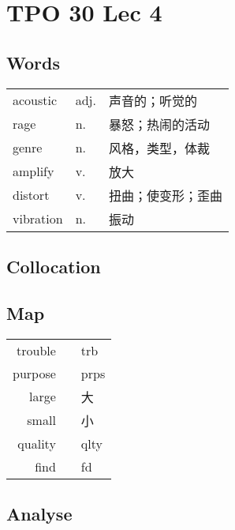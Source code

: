 \section{TPO 30 Lec 4}

\subsection{Words}

\begin{tabular}{lll}
    acoustic  & adj. & 声音的；听觉的   \\
    rage      & n.   & 暴怒；热闹的活动  \\
    genre     & n.   & 风格，类型，体裁  \\
    amplify   & v.   & 放大        \\
    distort   & v.   & 扭曲；使变形；歪曲 \\
    vibration & n.   & 振动        \\
\end{tabular}

\subsection{Collocation}

\subsection{Map}

\begin{tabular}{rc@{\quad$\to$\quad}l}
    trouble &  & trb  \\
    purpose &  & prps \\
    large   &  & 大    \\
    small   &  & 小    \\
    quality &  & qlty \\
    find    &  & fd   \\
\end{tabular}

\subsection{Analyse}
